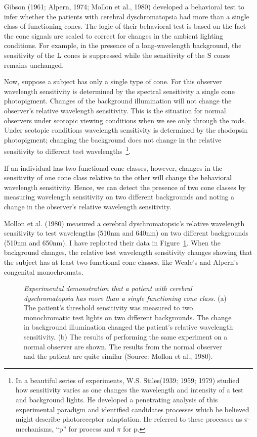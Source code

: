 Gibson (1961; Alpern, 1974; Mollon et al., 1980) developed a
behavioral test to infer whether the patients with cerebral
dyschromatopsia had more than a single class of functioning cones.
The logic of their behavioral test is based on the fact the cone
signals are scaled to correct for changes in the ambient lighting
conditions.  For example, in the presence of a long-wavelength
background, the sensitivity of the $\mbox{L}$ cones is suppressed while
the sensitivity of the $\mbox{S}$ cones remains unchanged.

Now, suppose a subject has only a single type of cone.  For
this observer wavelength sensitivity is determined by the spectral
sensitivity a single cone photopigment.  Changes of the background
illumination will not change the observer's relative wavelength
sensitivity.  This is the situation for normal observers under
scotopic viewing conditions when we see only through the rods.  Under
scotopic conditions wavelength sensitivity is determined by the rhodopsin
photopigment; changing the background does not change in the relative
sensitivity to different test wavelengths~\footnote{ In a beautiful
series of experiments, W.S. Stiles(1939; 1959; 1979) studied how
sensitivity varies as one changes the wavelength and intensity of a
test and background lights.  He developed a penetrating analysis of
this experimental paradigm and identified candidates processes which
he believed might describe photoreceptor adaptation.  He referred to
these processes as $\pi$-mechanisms, ``p'' for process and $\pi$ for
p.}.

If an individual has two functional cone classes, however, changes in
the sensitivity of one cone class relative to the other will change
the behavioral wavelength sensitivity.  Hence, we can detect the
presence of two cone classes by measuring wavelength sensitivity on
two different backgrounds and noting a change in the observer's
relative wavelength sensitivity.

Mollon et al. (1980) measured a cerebral dyschromatopsic's relative
wavelength sensitivity to test wavelengths (510nm and 640nm) on two
different backgrounds (510nm and 650nm).  I have replotted their data
in Figure~\ref{f8:mollon}.  When the background changes, the relative
test wavelength sensitivity changes showing that the subject has at
least two functional cone classes, like Weale's and Alpern's
congenital monochromats.
\begin{figure}
\centerline{
  }
\caption[Mollon data.]{ 
{\em Experimental demonstration that a patient with cerebral
dyschromatopsia has more than a single functioning cone class.} (a)
The patient's threshold sensitivity was measured to two monochromatic
test lights on two different backgrounds.  The change in background
illumination changed the patient's relative wavelength sensitivity.
(b) The results of performing the same experiment on a normal observer
are shown.  The results from the normal observer and the patient are
quite similar (Source: Mollon et al., 1980).  }
\label{f8:mollon} 
\end{figure}

